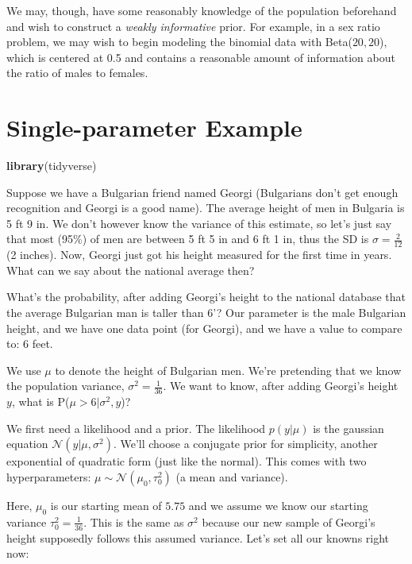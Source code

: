 \documentclass[]{book}
\newenvironment{Shaded}{\begin{snugshade}}{\end{snugshade}}
\newcommand{\KeywordTok}[1]{\textcolor[rgb]{0.13,0.29,0.53}{\textbf{#1}}}
\newcommand{\NormalTok}[1]{#1}
\begin{document}
We may, though, have some reasonably knowledge of the population
beforehand and wish to construct a \emph{weakly informative} prior. For
example, in a sex ratio problem, we may wish to begin modeling the
binomial data with Beta(\(20,20\)), which is centered at 0.5 and
contains a reasonable amount of information about the ratio of males to
females.

\section{Single-parameter Example}\label{single-parameter-example}

\begin{Shaded}
\begin{Highlighting}[]
\KeywordTok{library}\NormalTok{(tidyverse)}
\end{Highlighting}
\end{Shaded}

Suppose we have a Bulgarian friend named Georgi (Bulgarians don't get
enough recognition and Georgi is a good name). The average height of men
in Bulgaria is 5 ft 9 in. We don't however know the variance of this
estimate, so let's just say that most (95\%) of men are between 5 ft 5
in and 6 ft 1 in, thus the SD is \(\sigma = \frac{2}{12}\) (2 inches).
Now, Georgi just got his height measured for the first time in years.
What can we say about the national average then?

What's the probability, after adding Georgi's height to the national
database that the average Bulgarian man is taller than 6'? Our parameter
is the male Bulgarian height, and we have one data point (for Georgi),
and we have a value to compare to: 6 feet.

We use \(\mu\) to denote the height of Bulgarian men. We're pretending
that we know the population variance, \(\sigma^2 = \frac{1}{36}\). We
want to know, after adding Georgi's height \(y\), what is
P(\(\mu > 6 | \sigma^2, y\))?

We first need a likelihood and a prior. The likelihood \(p(y|\mu)\) is
the gaussian equation \(\mathcal{N}(y|\mu,\sigma^2)\). We'll choose a
conjugate prior for simplicity, another exponential of quadratic form
(just like the normal). This comes with two hyperparameters:
\(\mu \sim \mathcal{N}(\mu_0,\tau_0^2)\) (a mean and variance).

Here, \(\mu_0\) is our starting mean of \(5.75\) and we assume we know
our starting variance \(\tau_0^2 = \frac{1}{36}\). This is the same as
\(\sigma^2\) because our new sample of Georgi's height supposedly
follows this assumed variance. Let's set all our knowns right now:
\end{document}
